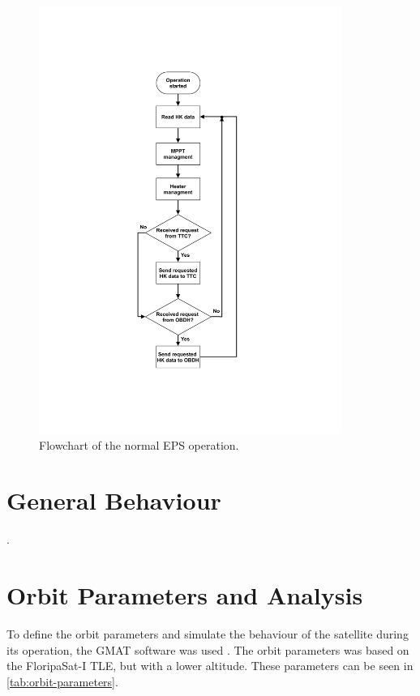 \begin{figure}[!ht]
    \begin{center}
        \includegraphics[width=0.88\textwidth]{figures/eps_flowchart.pdf}
        \caption{Flowchart of the normal EPS operation.}
        \label{fig:eps-flowchart}
    \end{center}
\end{figure}

\section{General Behaviour}

.

\section{Orbit Parameters and Analysis}

To define the orbit parameters and simulate the behaviour of the satellite during its operation, the GMAT software was used \cite{gmat}. The orbit parameters was based on the FloripaSat-I TLE, but with a lower altitude. These parameters can be seen in \autoref{tab:orbit-parameters}.

